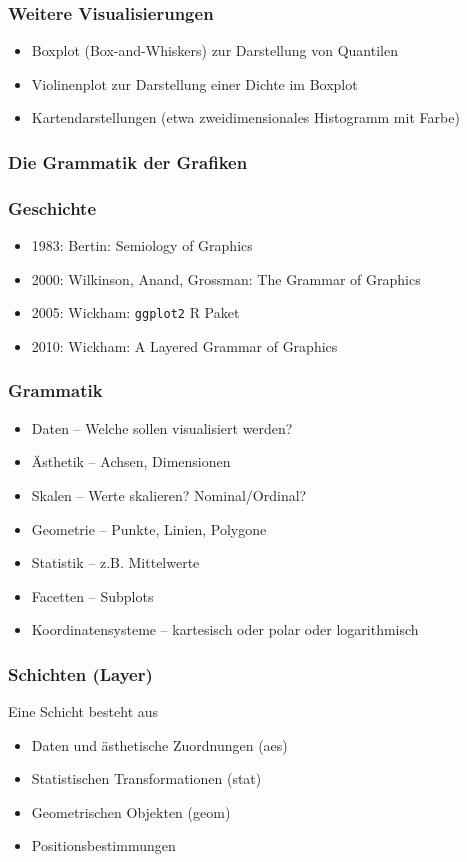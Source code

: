   \begin{frame}
    \frametitle{Weitere Visualisierungen}
    \begin{itemize}[<+->]
      \item Boxplot (Box-and-Whiskers) zur Darstellung von Quantilen
      \item Violinenplot zur Darstellung einer Dichte im Boxplot
      \item Kartendarstellungen (etwa zweidimensionales Histogramm mit Farbe)
    \end{itemize}
  \end{frame}

\begin{frame}[separator]
  \frametitle{Die Grammatik der Grafiken}
\end{frame}

\begin{frame}
  \frametitle{Geschichte}
  \begin{itemize}
  \item 1983: Bertin: Semiology of Graphics
  \item 2000: Wilkinson, Anand, Grossman: The Grammar of Graphics
  \item 2005: Wickham: \texttt{ggplot2} R Paket
  \item 2010: Wickham: A Layered Grammar of Graphics
  \end{itemize}
\end{frame}

\begin{frame}
  \frametitle{Grammatik}
  \begin{itemize}
  \item Daten – Welche sollen visualisiert werden?
  \item Ästhetik – Achsen, Dimensionen
  \item Skalen – Werte skalieren? Nominal/Ordinal?
  \item Geometrie – Punkte, Linien, Polygone
  \item Statistik – z.B. Mittelwerte
  \item Facetten – Subplots
  \item Koordinatensysteme – kartesisch oder polar oder logarithmisch
  \end{itemize}
\end{frame}

\begin{frame}
  \frametitle{Schichten (Layer)}
  Eine Schicht besteht aus
  \begin{itemize}
\item Daten und ästhetische Zuordnungen (aes)
\item Statistischen Transformationen (stat)
\item Geometrischen Objekten (geom)
\item Positionsbestimmungen
\end{itemize}
\end{frame}

